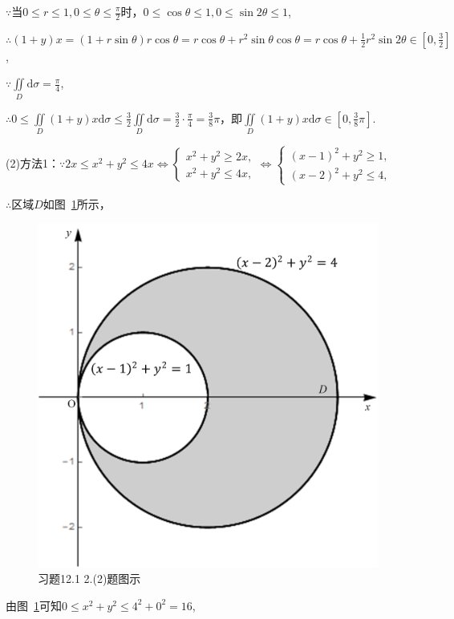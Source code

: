 \documentclass[12pt,UTF8]{ctexart}
\newcommand{\aIInt}[1]{\iint\limits_{#1}}
\begin{document}
\begin{enumerate}
$\because$当$0\leqslant r\leqslant1,0\leqslant\theta\leqslant\frac\pi2$时，$0\leqslant\cos\theta\leqslant1,0\leqslant\sin2\theta\leqslant1$,

$\therefore(1+y)x=(1+r\sin\theta)r\cos\theta=r\cos\theta+r^2\sin\theta\cos\theta=r\cos\theta+\frac12r^2\sin2\theta\in[0,\frac32]$,

$\because\aIInt{D}\mathrm d\sigma=\frac\pi4$,

$\therefore0\leqslant\aIInt{D}(1+y)x\mathrm d\sigma\leqslant\frac32\aIInt{D}\mathrm d\sigma=\frac32\cdot\frac\pi4=\frac38\pi$，即$\aIInt{D}(1+y)x\mathrm d\sigma\in[0,\frac38\pi]$.

(2)方法1：$\because 2x\leqslant x^2+y^2\leqslant4x\Leftrightarrow\begin{cases}
x^2+y^2\geqslant2x,\\
x^2+y^2\leqslant4x,
\end{cases}\Leftrightarrow\begin{cases}
(x-1)^2+y^2\geqslant1,\\
(x-2)^2+y^2\leqslant4,
\end{cases}$

$\therefore$区域$D$如图~\ref{2-2}所示，
\begin{figure}[H]
\begin{center}
\includegraphics[height=0.3\textheight]{Figures/Fig2-2.png}
\end{center}
\caption{习题12.1 2.(2)题图示}
\label{2-2}
\end{figure}
由图~\ref{2-2}可知$0\leqslant x^2+y^2\leqslant4^2+0^2=16$,


\end{enumerate}
\end{document}
